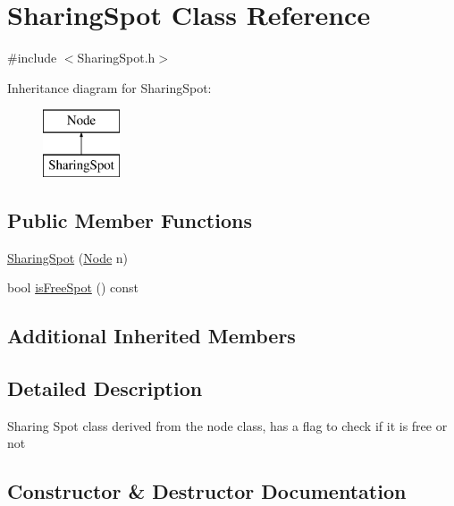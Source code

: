 \hypertarget{class_sharing_spot}{}\section{Sharing\+Spot Class Reference}
\label{class_sharing_spot}


{\ttfamily \#include $<$Sharing\+Spot.\+h$>$}

Inheritance diagram for Sharing\+Spot\+:\begin{figure}[H]
\begin{center}
\leavevmode
\includegraphics[height=2.000000cm]{class_sharing_spot}
\end{center}
\end{figure}
\subsection*{Public Member Functions}
\begin{DoxyCompactItemize}
\item 
\mbox{\hyperlink{class_sharing_spot_a1110d1c6955a7aa434a87bffb32e2ea3}{Sharing\+Spot}} (\mbox{\hyperlink{class_node}{Node}} n)
\item 
bool \mbox{\hyperlink{class_sharing_spot_a6b565d3a7fb62fb3235794a8381f9873}{is\+Free\+Spot}} () const
\end{DoxyCompactItemize}
\subsection*{Additional Inherited Members}


\subsection{Detailed Description}
Sharing Spot class derived from the node class, has a flag to check if it is free or not 

\subsection{Constructor \& Destructor Documentation}
\mbox{\label{class_sharing_spot_a1110d1c6955a7aa434a87bffb32e2ea3}} 
